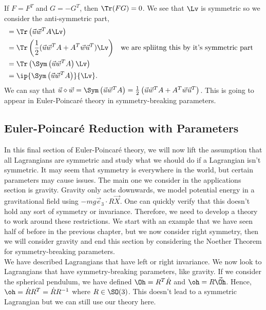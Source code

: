 
\noindent
If $F = F^T$ and $G = -G^T$, then $\Tr(FG) = 0$. We see that $\Lv$ is symmetric so we consider the anti-symmetric part,
\begin{align*}
  &= \Tr\left(\vec u\vec w^T A \Lv \right)\\
  &= \Tr \left(\frac{1}{2}(\vec u\vec w^T A + A^T \vec w\vec u^T)\Lv \right) && \text{we are spliitng this by it's symmetric part} \\
  &= \Tr\left(\Sym\left(\vec u\vec w^T A\right)\Lv\right) \\
  &= \ip{\Sym\left(\vec u\vec w^T A\right)}{\Lv}.
\end{align*}
We can say that $\vec u \diamond \vec w = \Sym\left(\vec u\vec w^T A\right) = \frac{1}{2}\left(\vec u\vec w^T A + A^T \vec w\vec u^T\right)$. This is going to appear in Euler-Poincar\'e theory in symmetry-breaking parameters.

\subsection{Euler-Poincar\'e Reduction with Parameters}
In this final section of Euler-Poincar\'e theory, we will now lift the assumption that all Lagrangians are symmetric and study what we should do if a Lagrangian isn't symmetric. It may seem that symmetry is everywhere in the world, but certain parameters may cause issues. The main one we consider in the applications section is gravity. Gravity only acts downwards, we model potential energy in a gravitational field using $-mg\vec e_3 \cdot R\vec X$. One can quickly verify that this doesn't hold any sort of symmetry or invariance. Therefore, we need to develop a theory to work around these restrictions. We start with an example that we have seen half of before in the previous chapter, but we now consider right symmetry, then we will consider gravity and end this section by considering the Noether Theorem for symmetry-breaking parameters.\\

\noindent
We have described Lagrangians that have left or right invariance. We now look to Lagrangians that have symmetry-breaking parameters, like gravity. If we consider the spherical pendulum, we have defined $\Oh = R^T\dot R$ and $\oh = R\vec\Oh$. Hence, $\oh = \dot R R^T = \dot R R^{-1}$ where $R \in \SO(3)$. This doesn't lead to a symmetric Lagrangian but we can still use our theory here. \\


